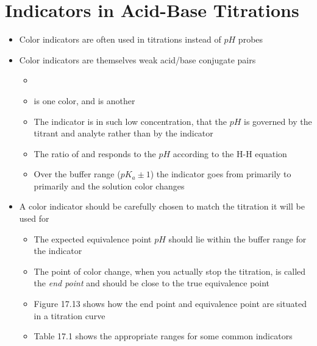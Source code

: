 \documentclass[12pt, openany, letterpaper]{memoir}
\begin{document}
\section{Indicators in Acid-Base Titrations}
\begin{itemize}
	\item Color indicators are often used in titrations instead of $pH$ probes
	\item Color indicators are themselves weak acid/base conjugate pairs
	\begin{itemize}
		\item {}
		\item {} is one color, and  is another
		\item The indicator is in such low concentration, that the $pH$ is governed by the titrant and analyte rather than by the indicator
		\item The ratio of  and  responds to the $pH$ according to the H-H equation
		\item Over the buffer range ($pK_a \pm1$) the indicator goes from primarily  to primarily  and the solution color changes
	\end{itemize}
	\item A color indicator should be carefully chosen to match the titration it will be used for
	\begin{itemize}
		\item The expected equivalence point $pH$ should lie within the buffer range for the indicator
		\item The point of color change, when you actually stop the titration, is called the \emph{end point} and should be close to the true equivalence point
		\item Figure 17.13 shows how the end point and equivalence point are situated in a titration curve
		\item Table 17.1 shows the appropriate ranges for some common indicators
	\end{itemize}
\end{itemize}
\end{document}
